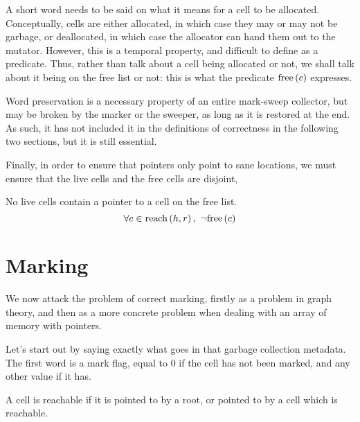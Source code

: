 A short word needs to be said on what it means for a cell to be
allocated. Conceptually, cells are either allocated, in which case
they may or may not be garbage, or deallocated, in which case the
allocator can hand them out to the mutator. However, this is a
temporal property, and difficult to define as a predicate. Thus,
rather than talk about a cell being allocated or not, we shall talk
about it being on the free list or not: this is what the predicate
$\free{c}$ expresses.

Word preservation is a necessary property of an entire mark-sweep
collector, but may be broken by the marker or the sweeper, as long as
it is restored at the end. As such, it has not included it in the
definitions of correctness in the following two sections, but it is
still essential.

Finally, in order to ensure that pointers only point to sane
locations, we must ensure that the live cells and the free cells are
disjoint,

\begin{definition}
  \label{def:ms-live-cell-invariant}
  No live cells contain a pointer to a cell on the free list.
  \[\forall c \in \reach{h}{r},\ \lnot\free{c}\]
\end{definition}

\section{Marking}
\label{sec:marksweep-marking}

We now attack the problem of correct marking, firstly as a problem in
graph theory, and then as a more concrete problem when dealing with an
array of memory with pointers.

Let's start out by saying exactly what goes in that garbage collection
metadata. The first word is a mark flag, equal to 0 if the cell has
not been marked, and any other value if it has.

\begin{definition}[Reachable]
  \label{def:ms-reachable}
  A cell is reachable if it is pointed to by a root, or pointed to by
  a cell which is reachable.

  \begin{minipage}{.5\textwidth}
    \begin{prooftree}
    \end{prooftree}
  \end{minipage}
  \begin{minipage}{.5\textwidth}
    \begin{prooftree}
    \end{prooftree}
  \end{minipage}
\end{definition}

